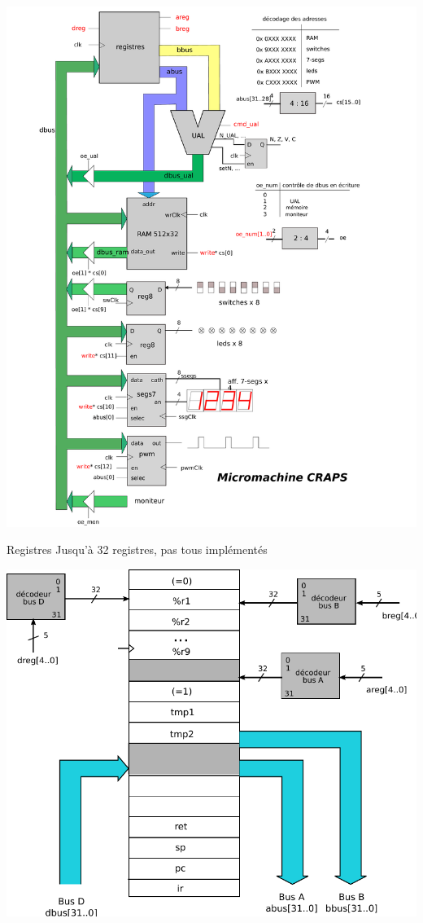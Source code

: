 \documentclass{beamer}
\begin{document}
  \begin{frame}
    \centering
    \includegraphics[height=\textheight, width=\textwidth, keepaspectratio]
                    {micromachine_fig.pdf}
  \end{frame}

  \begin{frame}{Registres}
    Jusqu'à 32 registres, pas tous implémentés
  \end{frame}

  \begin{frame}
    \centering
    \includegraphics[height=\textheight, width=\textwidth, keepaspectratio]
                    {registres_fig.pdf}
  \end{frame}
\end{document}
